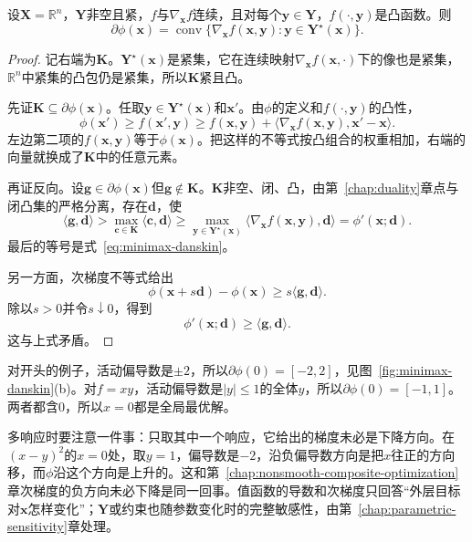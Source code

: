\begin{theorem}[最坏值函数的次微分]
\label{thm:minimax-subdiff}
设$\bm{X}=\mathbb{R}^{n}$，$\bm{Y}$非空且紧，$f$与$\nabla_{\bm{x}}f$连续，且对每个$\bm{y}\in\bm{Y}$，$f(\cdot,\bm{y})$是凸函数。则
\begin{equation}
 \partial\phi(\bm{x})=\operatorname{conv}\bigl\{\nabla_{\bm{x}}f(\bm{x},\bm{y}):\bm{y}\in\bm{Y}^\star(\bm{x})\bigr\}.
 \label{eq:minimax-subdiff}
\end{equation}
\end{theorem}

\begin{proof}
记右端为$\bm{K}$。$\bm{Y}^\star(\bm{x})$是紧集，它在连续映射$\nabla_{\bm{x}}f(\bm{x},\cdot)$下的像也是紧集，$\mathbb{R}^n$中紧集的凸包仍是紧集，所以$\bm{K}$紧且凸。

先证$\bm{K}\subseteq\partial\phi(\bm{x})$。任取$\bm{y}\in\bm{Y}^\star(\bm{x})$和$\bm{x}'$。由$\phi$的定义和$f(\cdot,\bm{y})$的凸性，
\[
 \phi(\bm{x}')\geq f(\bm{x}',\bm{y})\geq f(\bm{x},\bm{y})+\langle\nabla_{\bm{x}}f(\bm{x},\bm{y}),\bm{x}'-\bm{x}\rangle.
\]
左边第二项的$f(\bm{x},\bm{y})$等于$\phi(\bm{x})$。把这样的不等式按凸组合的权重相加，右端的向量就换成了$\bm{K}$中的任意元素。

再证反向。设$\bm{g}\in\partial\phi(\bm{x})$但$\bm{g}\notin\bm{K}$。$\bm{K}$非空、闭、凸，由第~\ref{chap:duality}章点与闭凸集的严格分离，存在$\bm{d}$，使
\[
 \langle\bm{g},\bm{d}\rangle>\max_{\bm{c}\in\bm{K}}\langle\bm{c},\bm{d}\rangle\geq\max_{\bm{y}\in\bm{Y}^\star(\bm{x})}\langle\nabla_{\bm{x}}f(\bm{x},\bm{y}),\bm{d}\rangle=\phi'(\bm{x};\bm{d}).
\]
最后的等号是式~\eqref{eq:minimax-danskin}。

另一方面，次梯度不等式给出
\[
 \phi(\bm{x}+s\bm{d})-\phi(\bm{x})\geq s\langle\bm{g},\bm{d}\rangle.
\]
除以$s>0$并令$s\downarrow0$，得到
\[
 \phi'(\bm{x};\bm{d})\geq\langle\bm{g},\bm{d}\rangle.
\]
这与上式矛盾。
\end{proof}

对开头的例子，活动偏导数是$\pm2$，所以$\partial\phi(0)=[-2,2]$，见图~\ref{fig:minimax-danskin}(b)。对$f=xy$，活动偏导数是$\lvert y\rvert\leq1$的全体$y$，所以$\partial\phi(0)=[-1,1]$。两者都含$0$，所以$x=0$都是全局最优解。

多响应时要注意一件事：只取其中一个响应，它给出的梯度未必是下降方向。在$(x-y)^2$的$x=0$处，取$y=1$，偏导数是$-2$，沿负偏导数方向是把$x$往正的方向移，而$\phi$沿这个方向是上升的。这和第~\ref{chap:nonsmooth-composite-optimization}章次梯度的负方向未必下降是同一回事。值函数的导数和次梯度只回答“外层目标对$\bm{x}$怎样变化”；$\bm{Y}$或约束也随参数变化时的完整敏感性，由第~\ref{chap:parametric-sensitivity}章处理。
